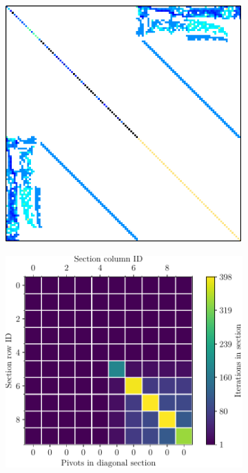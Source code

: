 \begin{figure}[ht!]
	\centering
	\begin{subfigure}[t]{0.45\textwidth}
		\centering
		\includegraphics[width=\textwidth, keepaspectratio]{images/ch03/input-matrices/decomposition-benchmarks/c-22.pdf}
		\label{Figure:comparing-decomposers-and-solvers->decomposition-project-benchmarks->decomposers-benchmark->comparison-of-execution-times-on-subset-of-matrices->matrix->c-22->nonzero-element-pattern}
	\end{subfigure}\hspace{0.03\textwidth}
	\begin{subfigure}[t]{0.51\textwidth}
		\centering
		\includegraphics[width=\textwidth, keepaspectratio, clip]{images/ch03/input-matrices/decomposition-benchmarks/c-22_icm32pp_metrics.pdf}

\end{subfigure}
\end{figure}
